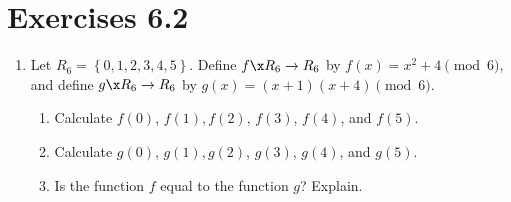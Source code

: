 \section*{Exercises 6.2}
%
\begin{enumerate}
\xitem Let  $R_5  = \left\{ {0, 1, 2, 3, 4} \right\}$.  Define  
$f\x R_5  \to R_5 $  by $f( x ) = x^2 + 4 \pmod 5$, 
\label{exer:sec62-1}
and define $g\x R_5  \to R_5 $  by 
$g( x ) = (x + 1)(x + 4) \pmod 5$.

\begin{enumerate}
  \item Calculate  $f( 0 )$, $f( 1 ), f( 2 )$, 
$f( 3 )$, and $f( 4 )$. 

  \item Calculate  $g( 0 )$, $g( 1 ), g( 2 )$, 
$g( 3 )$, and $g( 4 )$.

  \item Is the function  $f$  equal to the function $g$?  Explain.
\end{enumerate}

\item Let  $R_6  = \left\{ {0, 1, 2, 3, 4, 5} \right\}$.  Define  
$f\x R_6  \to R_6$  by $f( x ) = x^2 + 4 \pmod 6$, 
\label{exer:sec62-2}
and define $g\x R_6  \to R_6 $  by 
$g( x ) = (x + 1)(x + 4) \pmod 6$.

\begin{enumerate}
  \item Calculate  $f( 0 )$, $f( 1 ), f( 2 )$, 
$f( 3 )$, $f( 4 )$, and $f( 5 )$. 

  \item Calculate  $g( 0 )$, $g( 1 ), g( 2 )$, 
$g( 3 )$, $g( 4 )$, and $g( 5 )$.

  \item Is the function  $f$  equal to the function $g$?  Explain.
\end{enumerate}

%
%
%
%


\end{enumerate}
